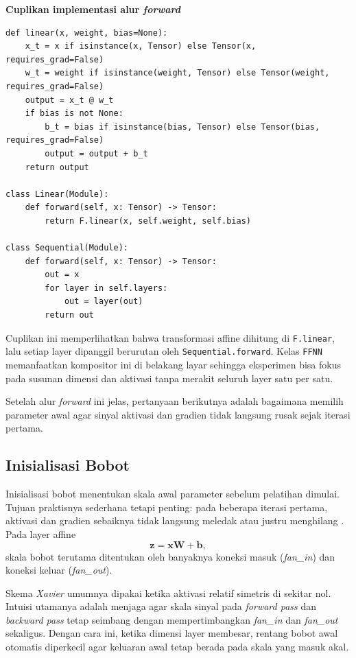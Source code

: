 \documentclass{article}
\begin{document}
\noindent\textbf{Cuplikan implementasi alur \textit{forward}}\par
\begin{lstlisting}
def linear(x, weight, bias=None):
    x_t = x if isinstance(x, Tensor) else Tensor(x, requires_grad=False)
    w_t = weight if isinstance(weight, Tensor) else Tensor(weight, requires_grad=False)
    output = x_t @ w_t
    if bias is not None:
        b_t = bias if isinstance(bias, Tensor) else Tensor(bias, requires_grad=False)
        output = output + b_t
    return output

class Linear(Module):
    def forward(self, x: Tensor) -> Tensor:
        return F.linear(x, self.weight, self.bias)

class Sequential(Module):
    def forward(self, x: Tensor) -> Tensor:
        out = x
        for layer in self.layers:
            out = layer(out)
        return out
\end{lstlisting}
Cuplikan ini memperlihatkan bahwa transformasi affine dihitung di \texttt{F.linear}, lalu setiap layer dipanggil berurutan oleh \texttt{Sequential.forward}. Kelas \texttt{FFNN} memanfaatkan kompositor ini di belakang layar sehingga eksperimen bisa fokus pada susunan dimensi dan aktivasi tanpa merakit seluruh layer satu per satu.

Setelah alur \textit{forward} ini jelas, pertanyaan berikutnya adalah bagaimana memilih parameter awal agar sinyal aktivasi dan gradien tidak langsung rusak sejak iterasi pertama.

\subsection{Inisialisasi Bobot}
\label{subsec:init-bobot}
Inisialisasi bobot menentukan skala awal parameter sebelum pelatihan dimulai. Tujuan praktisnya sederhana tetapi penting: pada beberapa iterasi pertama, aktivasi dan gradien sebaiknya tidak langsung meledak atau justru menghilang \citep{glorot2010difficulty,he2015delving,goodfellow2016dl}. Pada layer affine
\begin{equation}
\mathbf{z}=\mathbf{x}\mathbf{W}+\mathbf{b},
\end{equation}
skala bobot terutama ditentukan oleh banyaknya koneksi masuk (\textit{fan\_in}) dan koneksi keluar (\textit{fan\_out}).

Skema \textit{Xavier} umumnya dipakai ketika aktivasi relatif simetris di sekitar nol. Intuisi utamanya adalah menjaga agar skala sinyal pada \textit{forward pass} dan \textit{backward pass} tetap seimbang dengan mempertimbangkan \textit{fan\_in} dan \textit{fan\_out} sekaligus. Dengan cara ini, ketika dimensi layer membesar, rentang bobot awal otomatis diperkecil agar keluaran awal tetap berada pada skala yang masuk akal.
\end{document}
